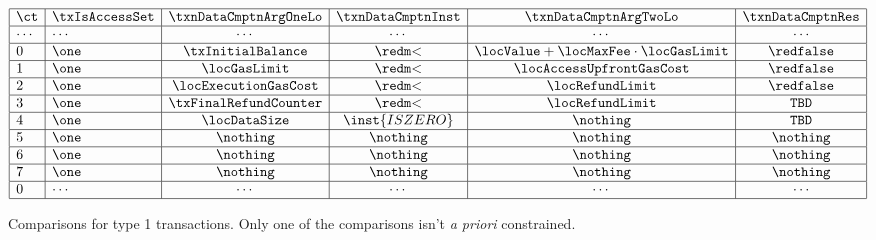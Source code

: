 \begin{figure}[!h]
	\[                                                                                                                          
	\begin{array}{|l|l|c|c|c|c|c|c|} \hline                                                                                                                      
		\ct    & \txIsAccessSet & \txnDataCmptnArgOneLo & \txnDataCmptnInst & \txnDataCmptnArgTwoLo                     & \txnDataCmptnRes \\ \hline
		\cdots & \cdots         & \cdots                & \cdots            & \cdots                                    & \cdots           \\ \hline
		0      & \one           & \txInitialBalance     & \locLT            & \locValue + \locMaxFee \cdot \locGasLimit & \rFaux           \\ \hline
		1      & \one           & \locGasLimit          & \locLT            & \locAccessUpfrontGasCost                  & \rFaux           \\ \hline
		2      & \one           & \locExecutionGasCost  & \locLT            & \locRefundLimit                           & \rFaux           \\ \hline
		3      & \one           & \txFinalRefundCounter & \locLT            & \locRefundLimit                           & \texttt{TBD}     \\ \hline
		4      & \one           & \locDataSize          & \inst{ISZERO}     & \nothing                                  & \texttt{TBD}     \\ \hline
		5      & \one           & \nothing              & \nothing          & \nothing                                  & \nothing         \\ \hline
		6      & \one           & \nothing              & \nothing          & \nothing                                  & \nothing         \\ \hline
		7      & \one           & \nothing              & \nothing          & \nothing                                  & \nothing         \\ \hline
		0      & \cdots         & \cdots                & \cdots            & \cdots                                    & \cdots           \\ \hline
	\end{array}                                                                                                                 
	\]                                                                                                                          
	\caption{%
		Comparisons for type 1 transactions. \saNote{} Only one of the comparisons isn't \emph{a priori} constrained.}
\end{figure}                                                                                                                

